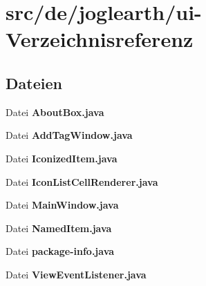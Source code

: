 \section{src/de/joglearth/ui-\/\-Verzeichnisreferenz}
\label{dir_4b274c199fc58ae06d55f08d9b9a949d}
\subsection*{Dateien}
\begin{DoxyCompactItemize}
\item 
Datei {\bfseries About\-Box.\-java}
\item 
Datei {\bfseries Add\-Tag\-Window.\-java}
\item 
Datei {\bfseries Iconized\-Item.\-java}
\item 
Datei {\bfseries Icon\-List\-Cell\-Renderer.\-java}
\item 
Datei {\bfseries Main\-Window.\-java}
\item 
Datei {\bfseries Named\-Item.\-java}
\item 
Datei {\bfseries package-\/info.\-java}
\item 
Datei {\bfseries View\-Event\-Listener.\-java}
\end{DoxyCompactItemize}
